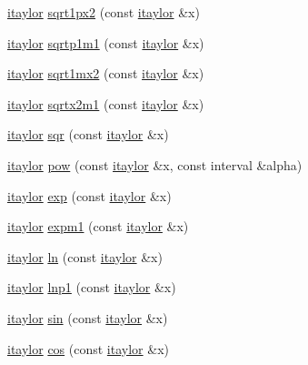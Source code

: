 \begin{DoxyCompactItemize}
\hyperlink{classtaylor_1_1itaylor}{itaylor} \hyperlink{classtaylor_1_1itaylor_afb2086a33961a372fdfddbc6f8c2bb19}{sqrt1px2} (const \hyperlink{classtaylor_1_1itaylor}{itaylor} \&x)
\item 
\hyperlink{classtaylor_1_1itaylor}{itaylor} \hyperlink{classtaylor_1_1itaylor_a1d4b5ebbb74084dcbbcdd5feb4980b79}{sqrtp1m1} (const \hyperlink{classtaylor_1_1itaylor}{itaylor} \&x)
\item 
\hyperlink{classtaylor_1_1itaylor}{itaylor} \hyperlink{classtaylor_1_1itaylor_a2a029f70653490604efa8b4f08a9875d}{sqrt1mx2} (const \hyperlink{classtaylor_1_1itaylor}{itaylor} \&x)
\item 
\hyperlink{classtaylor_1_1itaylor}{itaylor} \hyperlink{classtaylor_1_1itaylor_aa71646df2517a0c93f10ef9f936e3330}{sqrtx2m1} (const \hyperlink{classtaylor_1_1itaylor}{itaylor} \&x)
\item 
\hyperlink{classtaylor_1_1itaylor}{itaylor} \hyperlink{classtaylor_1_1itaylor_aea909b05cd5051da6dc84c98e3cf64eb}{sqr} (const \hyperlink{classtaylor_1_1itaylor}{itaylor} \&x)
\item 
\hyperlink{classtaylor_1_1itaylor}{itaylor} \hyperlink{classtaylor_1_1itaylor_a01ec110d820ad5da24c157ed72e10395}{pow} (const \hyperlink{classtaylor_1_1itaylor}{itaylor} \&x, const interval \&alpha)
\item 
\hyperlink{classtaylor_1_1itaylor}{itaylor} \hyperlink{classtaylor_1_1itaylor_a41c38304f26d68b981ac0e668d242492}{exp} (const \hyperlink{classtaylor_1_1itaylor}{itaylor} \&x)
\item 
\hyperlink{classtaylor_1_1itaylor}{itaylor} \hyperlink{classtaylor_1_1itaylor_a0824022a2814fa1a57cd136336834ff3}{expm1} (const \hyperlink{classtaylor_1_1itaylor}{itaylor} \&x)
\item 
\hyperlink{classtaylor_1_1itaylor}{itaylor} \hyperlink{classtaylor_1_1itaylor_a3ab0c3d85fa92ed6881fa80ca0593e4a}{ln} (const \hyperlink{classtaylor_1_1itaylor}{itaylor} \&x)
\item 
\hyperlink{classtaylor_1_1itaylor}{itaylor} \hyperlink{classtaylor_1_1itaylor_aae743e342c3929c1beca14adece530f7}{lnp1} (const \hyperlink{classtaylor_1_1itaylor}{itaylor} \&x)
\item 
\hyperlink{classtaylor_1_1itaylor}{itaylor} \hyperlink{classtaylor_1_1itaylor_a146672640c9c6e4e37f566f551e12550}{sin} (const \hyperlink{classtaylor_1_1itaylor}{itaylor} \&x)
\item 
\hyperlink{classtaylor_1_1itaylor}{itaylor} \hyperlink{classtaylor_1_1itaylor_a61e4504f3507332a814007be5fc8cf9b}{cos} (const \hyperlink{classtaylor_1_1itaylor}{itaylor} \&x)

\end{DoxyCompactItemize}
